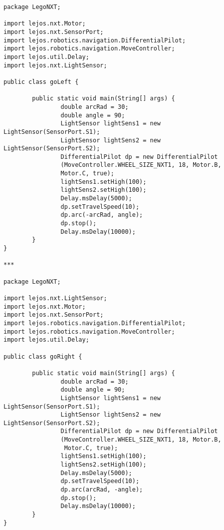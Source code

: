 \documentclass[a4paper, 12pt]{article}
\begin{document}
\begin{lstlisting}
package LegoNXT;

import lejos.nxt.Motor;
import lejos.nxt.SensorPort;
import lejos.robotics.navigation.DifferentialPilot;
import lejos.robotics.navigation.MoveController;
import lejos.util.Delay;
import lejos.nxt.LightSensor;

public class goLeft {

        public static void main(String[] args) {
                double arcRad = 30;
                double angle = 90;
                LightSensor lightSens1 = new LightSensor(SensorPort.S1);
                LightSensor lightSens2 = new LightSensor(SensorPort.S2);
                DifferentialPilot dp = new DifferentialPilot
                (MoveController.WHEEL_SIZE_NXT1, 18, Motor.B,
                Motor.C, true);
                lightSens1.setHigh(100);
                lightSens2.setHigh(100);
                Delay.msDelay(5000);
                dp.setTravelSpeed(10);
                dp.arc(-arcRad, angle);
                dp.stop();
                Delay.msDelay(10000);
        }
}

***

package LegoNXT;

import lejos.nxt.LightSensor;
import lejos.nxt.Motor;
import lejos.nxt.SensorPort;
import lejos.robotics.navigation.DifferentialPilot;
import lejos.robotics.navigation.MoveController;
import lejos.util.Delay;

public class goRight {

        public static void main(String[] args) {
                double arcRad = 30;
                double angle = 90;
                LightSensor lightSens1 = new LightSensor(SensorPort.S1);
                LightSensor lightSens2 = new LightSensor(SensorPort.S2);
                DifferentialPilot dp = new DifferentialPilot
                (MoveController.WHEEL_SIZE_NXT1, 18, Motor.B,
                 Motor.C, true);
                lightSens1.setHigh(100);
                lightSens2.setHigh(100);
                Delay.msDelay(5000);		
                dp.setTravelSpeed(10);
                dp.arc(arcRad, -angle);
                dp.stop();
                Delay.msDelay(10000);
        }
}

\end{lstlisting}
\end{document}
